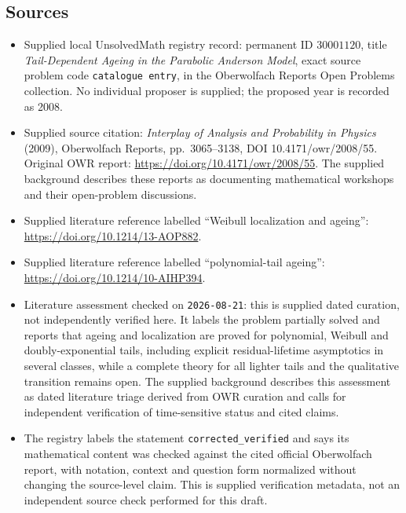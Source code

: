 \documentclass[11pt]{article}
\begin{document}
\subsection{Sources}
\begin{itemize}
\item Supplied local UnsolvedMath registry record: permanent ID \(30001120\), title \emph{Tail-Dependent Ageing in the Parabolic Anderson Model}, exact source problem code \texttt{catalogue entry}, in the Oberwolfach Reports Open Problems collection. No individual proposer is supplied; the proposed year is recorded as 2008.
\item Supplied source citation: \emph{Interplay of Analysis and Probability in Physics} (2009), Oberwolfach Reports, pp.~3065--3138, DOI 10.4171/owr/2008/55. Original OWR report: \url{https://doi.org/10.4171/owr/2008/55}. The supplied background describes these reports as documenting mathematical workshops and their open-problem discussions.
\item Supplied literature reference labelled ``Weibull localization and ageing'': \url{https://doi.org/10.1214/13-AOP882}.
\item Supplied literature reference labelled ``polynomial-tail ageing'': \url{https://doi.org/10.1214/10-AIHP394}.
\item Literature assessment checked on \texttt{2026-08-21}: this is supplied dated curation, not independently verified here. It labels the problem partially solved and reports that ageing and localization are proved for polynomial, Weibull and doubly-exponential tails, including explicit residual-lifetime asymptotics in several classes, while a complete theory for all lighter tails and the qualitative transition remains open. The supplied background describes this assessment as dated literature triage derived from OWR curation and calls for independent verification of time-sensitive status and cited claims.
\item The registry labels the statement \texttt{corrected\_verified} and says its mathematical content was checked against the cited official Oberwolfach report, with notation, context and question form normalized without changing the source-level claim. This is supplied verification metadata, not an independent source check performed for this draft.
\end{itemize}
\end{document}
